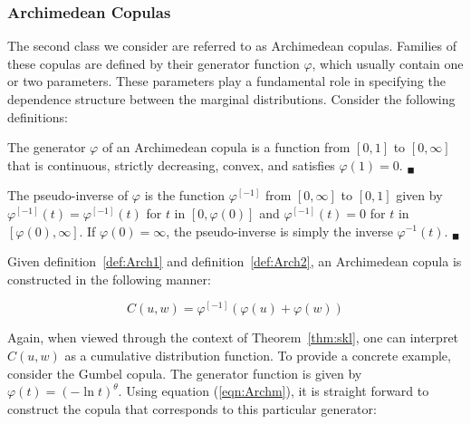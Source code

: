 \subsubsection{Archimedean Copulas}

The second class we consider are referred to as Archimedean copulas. Families of these copulas are defined by their generator function $\varphi$, which usually contain one or two parameters. These parameters play a fundamental role in specifying the dependence structure between the marginal distributions. Consider the following definitions:

\begin{definition} \label{def:Arch1}
	The generator $\varphi$ of an Archimedean copula is a function from $\left[0,1\right]$ to $\left[0,\infty\right]$ that is continuous, strictly decreasing, convex, and satisfies $\varphi\left(1\right) = 0$. $_{\blacksquare}$
\end{definition}

\begin{definition} \label{def:Arch2}
	The pseudo-inverse of $\varphi$ is the function $\varphi^{\left[-1\right]}$ from $\left[0,\infty\right]$ to $\left[0,1\right]$ given by $\varphi^{\left[-1\right]}\left(t\right) = \varphi^{\left[-1\right]}\left(t\right)$ for $t$ in $\left[0,\varphi\left(0\right)\right]$ and $\varphi^{\left[-1\right]}\left(t\right) = 0$ for $t$ in $\left[\varphi\left(0\right),\infty\right]$. If $\varphi\left(0\right) = \infty$, the pseudo-inverse is simply the inverse $\varphi^{-1}\left(t\right)$. $_{\blacksquare}$
\end{definition}

Given definition~\ref{def:Arch1} and definition~\ref{def:Arch2}, an Archimedean copula is constructed in the following manner:

\begin{equation} \label{eqn:Archm}
	C\left(u,w\right) = \varphi^{\left[-1\right]}\left(\varphi\left(u\right)+\varphi\left(w\right)\right)
\end{equation}

Again, when viewed through the context of Theorem~\ref{thm:skl}, one can interpret $C\left(u,w\right)$ as a cumulative distribution function. To provide a concrete example, consider the Gumbel copula. The generator function is given by $\varphi\left(t\right) = \left(-\ln t\right)^{\theta}$. Using equation (\ref{eqn:Archm}), it is straight forward to construct the copula that corresponds to this particular generator:

